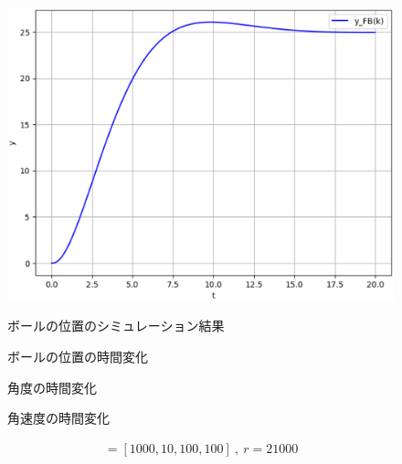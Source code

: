 \documentclass[a4paper,10.5pt]{ltjsarticle}
\begin{document}
\begin{figure}[h]
  \centering
  \vspace{-30pt}
  \begin{minipage}[h]{0.4\linewidth}
    \centering
    \includegraphics[scale=0.35]{figure16.eps}
    \caption{ボールの位置のシミュレーション結果}
    \label{fig:figure16}
  \end{minipage}
  \begin{minipage}[h]{0.4\linewidth}
    \centering
    
    \vspace{-30pt}\caption{ボールの位置の時間変化}
    \label{fig:figure17}
  \end{minipage}
  \begin{minipage}[h]{0.4\linewidth}
    \centering
    
    \vspace{-30pt}\caption{角度の時間変化}
    \label{fig:figure18}
  \end{minipage}
  \begin{minipage}[h]{0.4\linewidth}
    \centering
    
    \vspace{-30pt}\caption{角速度の時間変化}
    \label{fig:figure19}
  \end{minipage}
\end{figure}
\begin{align}
  [q_1,q_2,q_3,q_4]=[1000,10,100,100]\ ,\ r=21000
\end{align}
\end{document}
